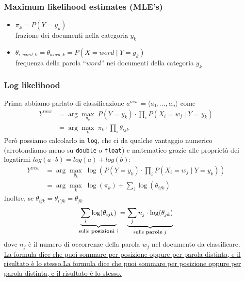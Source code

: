 \documentclass[a4paper,12pt]{article}
\let\mathunderline\underline
\renewcommand{\underline}[1]{\ifmmode\mathunderline{#1}\else\uline{#1}\fi}   %
\begin{document}
\subsubsection{Maximum likelihood estimates (MLE’s)}
\begin{itemize}
    \item $\pi_k = P(Y=y_k)$\\
    frazione dei documenti nella categoria $y_k$
    \item $\theta_{i,word,k} = \theta_{word,k} = P(X=word \mid Y=y_k)$\\
    frequenza della parola ``$word$'' nei documenti della categoria $y_k$
\end{itemize}
\subsubsection{Log likelihood}
Prima abbiamo parlato di classificazione $a^{new}=\langle a_1,\dots,a_n\rangle$ come
\begin{align*}
    Y^{new} &= \arg\max_{y_k}\; P(Y=y_k)\cdot\prod_i P(X_i=w_j \mid Y=y_k)\\
            &= \arg\max_{k}\; \pi_k\cdot\prod_i \theta_{ijk}
\end{align*}
Però possiamo calcolarlo in \texttt{log}, che ci da qualche vantaggio numerico (arrotondiamo meno su \texttt{double} o \texttt{float}) e matematico grazie alle proprietà dei logatirmi $log(a \cdot b) = log(a)+log(b)$:
\begin{align*}
    Y^{new} &= \arg\max_{y_k}\; \log\left(P(Y=y_k)\cdot\prod_i P(X_i=w_j \mid Y=y_k)\right)\\
            &= \arg\max_{k}\; \log(\pi_k) + \sum_i \log(\theta_{ijk})
\end{align*}
Inoltre, se $\theta_{ijk}=\theta_{i'jk}=\theta_{jk}$
\begin{align*}
    \underbrace{\sum_i \log(\theta_{ijk})}_{\text{sulle \textbf{posizioni} } i} = \underbrace{\sum_j n_j\cdot\log(\theta_{jk})}_{\text{sulle \textbf{parole} } j}
\end{align*}
dove $n_j$ è il numero di occorrenze della parola $w_j$ nel documento da classificare.\\
\underline{La formula dice che puoi sommare per posizione oppure per parola distinta, e il risultato è lo stesso.}
\end{document}
